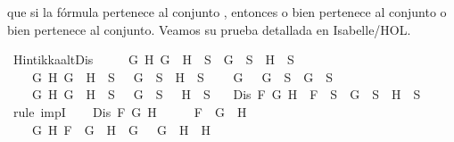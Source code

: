 \begin{isabellebody}
\begin{isamarkuptext}
  que si la fórmula pertenece al conjunto , entonces o bien  pertenece al
  conjunto o bien  pertenece al conjunto. Veamos su prueba detallada en 
  Isabelle/HOL.%
\end{isamarkuptext}\isamarkuptrue%
\isamarkupfalse%
\ Hintikka{\isacharunderscore}alt{}Dis{\isacharcolon}\isanewline
\ \ \ \ {\isachardoublequoteopen}{\isacharparenleft}{\isasymforall}\ G\ H{\isachardot}\ G\ \isactrlbold {\isasymor}\ H\ {\isasymin}\ S\ {\isasymlongrightarrow}\ G\ {\isasymin}\ S\ {\isasymor}\ H\ {\isasymin}\ S{\isacharparenright}\isanewline
\ \ {\isasymand}\ {\isacharparenleft}{\isasymforall}\ G\ H{\isachardot}\ G\ \isactrlbold {\isasymrightarrow}\ H\ {\isasymin}\ S\ {\isasymlongrightarrow}\ \isactrlbold {\isasymnot}\ G\ {\isasymin}\ S\ {\isasymor}\ H\ {\isasymin}\ S{\isacharparenright}\isanewline
\ \ {\isasymand}\ {\isacharparenleft}{\isasymforall}\ G{\isachardot}\ \isactrlbold {\isasymnot}\ {\isacharparenleft}\isactrlbold {\isasymnot}\ G{\isacharparenright}\ {\isasymin}\ S\ {\isasymlongrightarrow}\ G\ {\isasymin}\ S{\isacharparenright}\isanewline
\ \ {\isasymand}\ {\isacharparenleft}{\isasymforall}\ G\ H{\isachardot}\ \isactrlbold {\isasymnot}{\isacharparenleft}G\ \isactrlbold {\isasymand}\ H{\isacharparenright}\ {\isasymin}\ S\ {\isasymlongrightarrow}\ \isactrlbold {\isasymnot}\ G\ {\isasymin}\ S\ {\isasymor}\ \isactrlbold {\isasymnot}\ H\ {\isasymin}\ S{\isacharparenright}{\isachardoublequoteclose}\isanewline
\ \ \ {\isachardoublequoteopen}Dis\ F\ G\ H\ {\isasymlongrightarrow}\ F\ {\isasymin}\ S\ {\isasymlongrightarrow}\ G\ {\isasymin}\ S\ {\isasymor}\ H\ {\isasymin}\ S{\isachardoublequoteclose}\isanewline
%
\isadelimproof
%
\endisadelimproof
%
\isatagproof
{}\isamarkupfalse%
\ {\isacharparenleft}rule\ impI{\isacharparenright}\isanewline
\ \ \isamarkupfalse%
\ {\isachardoublequoteopen}Dis\ F\ G\ H{\isachardoublequoteclose}\isanewline
\ \ \isamarkupfalse%
\ \isamarkupfalse%
\ {\isachardoublequoteopen}F\ {\isacharequal}\ G\ \isactrlbold {\isasymor}\ H\ {\isasymor}\ \isanewline
\ \ \ \ {\isacharparenleft}{\isasymexists}G{}\ H{}{\isachardot}\ F\ {\isacharequal}\ G{}\ \isactrlbold {\isasymrightarrow}\ H{}\ {\isasymand}\ G\ {\isacharequal}\ \isactrlbold {\isasymnot}\ G{}\ {\isasymand}\ H\ {\isacharequal}\ H{}{\isacharparenright}\ {\isasymor}\ \isanewline

\end{isabellebody}
